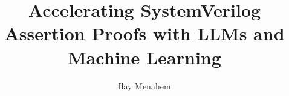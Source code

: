 \documentclass[12pt]{article}
\begin{document}
\title{Accelerating SystemVerilog Assertion Proofs with LLMs and Machine Learning}
\author{Ilay Menahem}

\maketitle










\appendix




\end{document}
